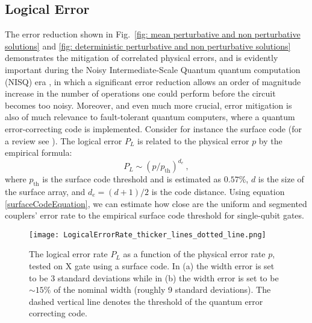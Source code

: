 \documentclass[floatfix,reprint, amsmath,amssymb,aps,superscriptaddress,nofootinbib]{revtex4-2}
\begin{document}
\subsection{Logical Error}

The error reduction shown in Fig.~\ref{fig: mean perturbative and non perturbative solutions} and \ref{fig: deterministic perturbative and non perturbative solutions} demonstrates the mitigation 
of correlated physical errors, and is evidently important during the Noisy Intermediate-Scale Quantum quantum computation (NISQ) era \cite{NISQ}, in which a significant error reduction allows an order of magnitude increase in the number of operations one could perform before the circuit becomes too noisy. Moreover, and even much more crucial, error mitigation is also of much relevance to fault-tolerant quantum computers,
where a quantum error-correcting code is implemented. Consider for instance the surface code (for a review see \cite{surfaceCodes}).
The logical error $P_L$ is related to the physical error $p$ by the empirical formula:
\begin{equation}
    P_L \sim (p/p_\mathrm{th})^{d_e} \ ,
\label{surfaceCodeEquation}
\end{equation}
where $p_\mathrm{th}$ is the surface code threshold and is estimated as $0.57 \%$, $d$ is the size of the surface array, and $d_e=(d+1)/2$ is the code distance.
Using equation \ref{surfaceCodeEquation}, we can estimate how close are the uniform and segmented couplers' error rate 
to the empirical surface code threshold for single-qubit gates.

\begin{figure}[!h]
     \centering
     \texttt{[image: LogicalErrorRate\_thicker\_lines\_dotted\_line.png]}
     \caption{The logical error rate $P_L$ as a function of the physical error rate $p$, tested on X gate using a surface code. In (a) the width error is set to be 3 standard deviations while in (b) the width error is set to be $\sim 15 \%$ of the nominal width (roughly 9 standard deviations). The dashed vertical line denotes the threshold of the quantum error correcting code. 
     }
     \label{fig: Logical Error Rate}
\end{figure}



\end{document}

